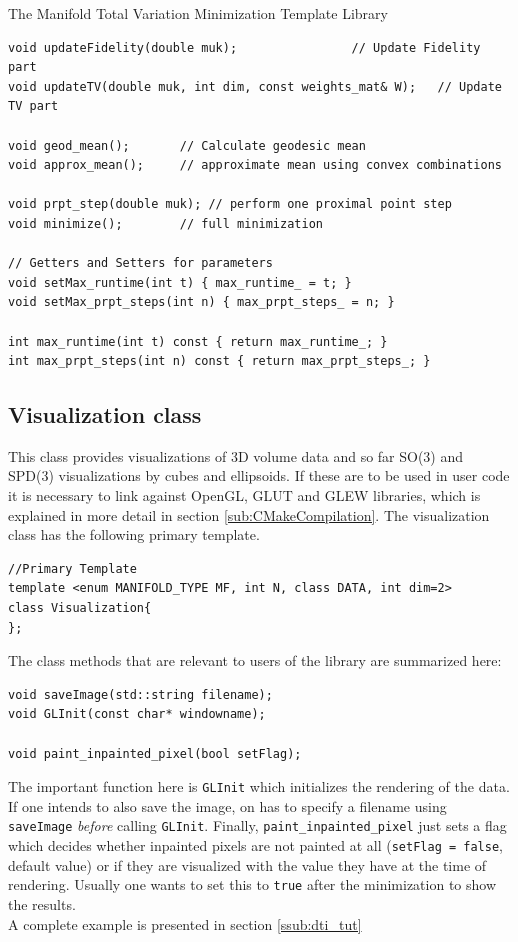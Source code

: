 \begin{chapter}{The Manifold Total Variation Minimization Template Library}
\begin{lstlisting}
void updateFidelity(double muk);			    // Update Fidelity part
void updateTV(double muk, int dim, const weights_mat& W);   // Update TV part

void geod_mean();	    // Calculate geodesic mean
void approx_mean();	    // approximate mean using convex combinations

void prpt_step(double muk); // perform one proximal point step
void minimize();	    // full minimization

// Getters and Setters for parameters
void setMax_runtime(int t) { max_runtime_ = t; }
void setMax_prpt_steps(int n) { max_prpt_steps_ = n; }
	    
int max_runtime(int t) const { return max_runtime_; }
int max_prpt_steps(int n) const { return max_prpt_steps_; }
\end{lstlisting}



\subsection{Visualization class} %
\label{sub:Visualization class}
This class provides visualizations of 3D volume data and so far SO(3) and SPD(3) visualizations by cubes and ellipsoids. If these are to be used in user code it is necessary to link
against OpenGL, GLUT and GLEW libraries, which is explained in more detail in section \ref{sub:CMakeCompilation}. The visualization class has the following primary template.
\cppinline
\begin{lstlisting}
//Primary Template
template <enum MANIFOLD_TYPE MF, int N, class DATA, int dim=2>
class Visualization{
};
\end{lstlisting}

The class methods that are relevant to users of the library are summarized here:\\
\cppinline
\begin{lstlisting}
void saveImage(std::string filename);
void GLInit(const char* windowname);

void paint_inpainted_pixel(bool setFlag);
\end{lstlisting}

The important function here is \texttt{GLInit} which initializes the rendering of the data. If one intends to also save the image, on has to specify a filename using
\texttt{saveImage} \textit{before} calling \texttt{GLInit}. Finally, \texttt{paint\_inpainted\_pixel} just sets a flag which decides whether inpainted pixels are not painted
at all (\texttt{setFlag = false}, default value) or if they are visualized with the value they have at the time of rendering. Usually one wants to set this to \texttt{true}
after the minimization to show the results.\\
A complete example is presented in section \ref{ssub:dti_tut}\\


\end{chapter}
